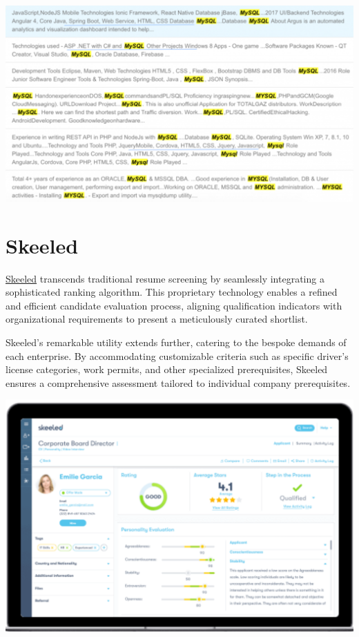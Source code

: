\documentclass[
]{book}
\begin{document}
\includegraphics[width=5.36458in,height=\textheight]{cvviz pic 2.png}

\hypertarget{skeeled}{%
\section{Skeeled}\label{skeeled}}

\href{https://www.skeeled.com/services}{Skeeled} transcends traditional resume screening by seamlessly integrating a sophisticated ranking algorithm. This proprietary technology enables a refined and efficient candidate evaluation process, aligning qualification indicators with organizational requirements to present a meticulously curated shortlist.

Skeeled's remarkable utility extends further, catering to the bespoke demands of each enterprise. By accommodating customizable criteria such as specific driver's license categories, work permits, and other specialized prerequisites, Skeeled ensures a comprehensive assessment tailored to individual company prerequisites.

\includegraphics[width=5.30208in,height=\textheight]{skeeled pic.png}
\end{document}
